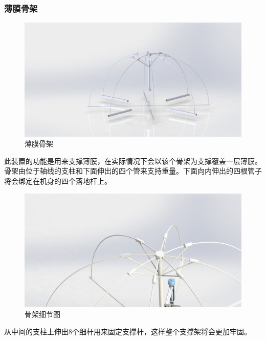 \documentclass{ctexart}
\begin{document}
\subsubsection{薄膜骨架}
\begin{figure}[H]
\centering
    \includegraphics[width = \textwidth]{007}
    \caption{薄膜骨架}\par
\end{figure}
此装置的功能是用来支撑薄膜，在实际情况下会以该个骨架为支撑覆盖一层薄膜。骨架由位于轴线的支柱和下面伸出的四个管来支持重量。下面向内伸出的四根管子将会绑定在机身的四个落地杆上。
\begin{figure}[H]
\centering
    \includegraphics[width = \textwidth]{008}
    \caption{骨架细节图}\par
\end{figure}
从中间的支柱上伸出8个细杆用来固定支撑杆，这样整个支撑架将会更加牢固。
\end{document}
